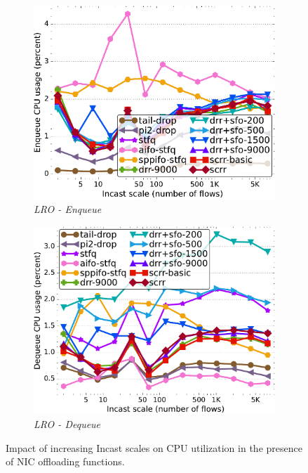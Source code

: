 \begin{figure}[t]
    \centering
	\begin{subfigure}[t]{.48\linewidth}
		\centering\includegraphics[width=0.99\linewidth]{figs/paral_cn_1t4x1024_gro_kp_eq_comp_methods.pdf}
    \caption{\small{\textit{LRO - Enqueue}}}
	\label{fig:cpu-gro-enqueue}

	\end{subfigure}
	\begin{subfigure}[t]{.48\linewidth}
		\centering
        \includegraphics[width=0.99\linewidth]{figs/paral_cn_1t4x1024_gro_kp_dq_comp_methods.pdf}
    \caption{\small{\textit{LRO - Dequeue}}}
	\label{fig:cpu-gro-dequeue}

	\end{subfigure}
 \vspace{-2mm}
    \caption{\small{Impact of increasing Incast scales on CPU utilization in the presence of NIC offloading functions.}}
    \label{fig:cpu-gro-eqdq}
    \vspace{-4mm}
\end{figure}


